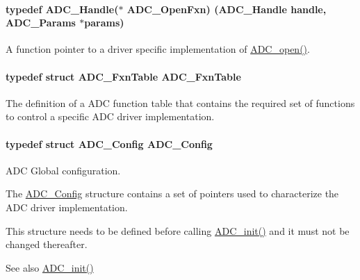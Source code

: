 \paragraph[{A\+D\+C\+\_\+\+Open\+Fxn}]{\setlength{\rightskip}{0pt plus 5cm}typedef {\bf A\+D\+C\+\_\+\+Handle}($\ast$ A\+D\+C\+\_\+\+Open\+Fxn) ({\bf A\+D\+C\+\_\+\+Handle} handle, {\bf A\+D\+C\+\_\+\+Params} $\ast$params)}\label{_a_d_c_8h_a753af5a6a07905e109bbdecb785ac44d}


A function pointer to a driver specific implementation of \hyperlink{_a_d_c_8h_a9f3e5f311cda4df63e70660651b9314e}{A\+D\+C\+\_\+open()}. 

\paragraph[{A\+D\+C\+\_\+\+Fxn\+Table}]{\setlength{\rightskip}{0pt plus 5cm}typedef struct {\bf A\+D\+C\+\_\+\+Fxn\+Table}  {\bf A\+D\+C\+\_\+\+Fxn\+Table}}\label{_a_d_c_8h_a587cff1a3914cf624037cf8a01649380}


The definition of a A\+D\+C function table that contains the required set of functions to control a specific A\+D\+C driver implementation. 

\paragraph[{A\+D\+C\+\_\+\+Config}]{\setlength{\rightskip}{0pt plus 5cm}typedef struct {\bf A\+D\+C\+\_\+\+Config}  {\bf A\+D\+C\+\_\+\+Config}}\label{_a_d_c_8h_af334849657f87b79a31392f89828299a}


A\+D\+C Global configuration. 

The \hyperlink{struct_a_d_c___config}{A\+D\+C\+\_\+\+Config} structure contains a set of pointers used to characterize the A\+D\+C driver implementation.

This structure needs to be defined before calling \hyperlink{_a_d_c_8h_a4b4a2ddcb45df0c8497c47d4ed800e2a}{A\+D\+C\+\_\+init()} and it must not be changed thereafter.

\begin{DoxySeeAlso}{See also}
\hyperlink{_a_d_c_8h_a4b4a2ddcb45df0c8497c47d4ed800e2a}{A\+D\+C\+\_\+init()} 
\end{DoxySeeAlso}


